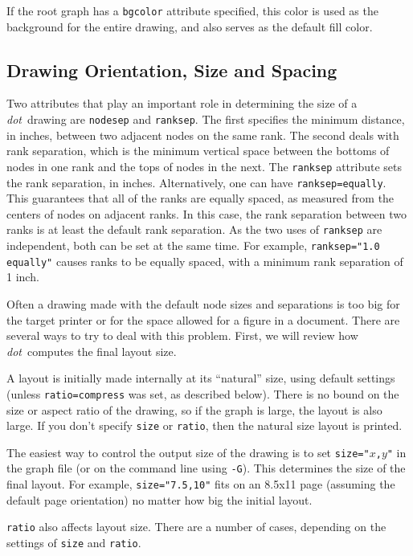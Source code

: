 \documentclass[11pt]{article}
\def\dot{{\it dot}}
\begin{document}
{If the root graph has a {\tt bgcolor} attribute specified, this color is used
as the background for the entire drawing, and also serves as the default
fill color.

\subsection{Drawing Orientation, Size and Spacing}

Two attributes that play an important role in determining the size of
a \dot\ drawing are {\tt nodesep} and {\tt ranksep}.
The first specifies the minimum distance, in inches, between two 
adjacent nodes on the same rank.
The second deals with rank separation, which is the minimum vertical space
between the bottoms of nodes in one rank and the tops of nodes in the next.
The {\tt ranksep} attribute sets the rank separation, in inches.
Alternatively, one can have {\tt ranksep=equally}. This guarantees
that all of the ranks are equally spaced, as measured from the
centers of nodes on adjacent ranks. In this case, the rank separation
between two ranks is at least the default rank separation. As the
two uses of {\tt ranksep} are independent, both can be set at the
same time. For example, {\tt ranksep="1.0 equally"} causes ranks to
be equally spaced, with a minimum rank separation of 1 inch.

Often a drawing made with the default node sizes and separations
is too big for the target printer or for the space allowed for
a figure in a document.  There are several ways to try to deal with
this problem.   First, we will review how \dot\ computes the 
final layout size.

A layout is initially made internally at its ``natural'' size,
using default settings (unless {\tt ratio=compress} was set,
as described below). There is no
bound on the size or aspect ratio of the drawing, so if the graph
is large, the layout is also large.  If you don't specify {\tt size}
or {\tt ratio}, then the natural size layout is printed.

The easiest way to control the output size of the drawing is to
set {\tt size="$x$,$y$"} in the graph file (or on the command line
using \verb"-G").
This determines the size of the final layout.
For example, \verb'size="7.5,10"' fits on an 8.5x11 page
(assuming the default page orientation)
no matter how big the initial layout.

\verb"ratio" also affects layout size.
There are a number of cases, depending on the settings of {\tt size}
and {\tt ratio}.

}
\end{document}
